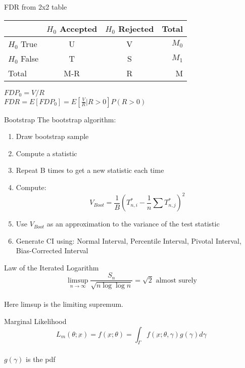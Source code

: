 \documentclass[avery5388,grid,frame]{flashcards}
\begin{document}
\begin{flashcard}[Definition]{FDR from 2x2 table}
\bigskip\bigskip
\begin{center}
{\begin{tabular}{l|c|c|r}
\hline
&\textrm{$H_0$ Accepted}&\textrm{$H_0$ Rejected}&Total\\
\hline
\textrm{$H_0$ True}& U & V& $M_0$\\
\hline
\textrm{$H_0$ False}&T&S&$M_1$\\
\hline
\textrm{Total}&M-R&R&M\\
\hline
\end{tabular}}
\end{center}
$FDP_0=V/R$\\
$FDR=E[FDP_0]=E\left[\frac{V}{R}|R>0\right]P(R>0)$
\end{flashcard}
\begin{flashcard}[Definition]{Bootstrap}
The bootstrap algorithm:
\begin{enumerate}
\item Draw bootstrap sample
\item Compute a statistic
\item Repeat B times to get a new statistic each time
\item Compute:
\begin{equation*}
V_{Boot}=\frac{1}{B}\left(T^*_{n,i}-\frac{1}{n}\sum T^*_{n,j}\right)^2
\end{equation*}
\item Use $V_{Boot}$ as an approximation to the variance of the test statistic
\item Generate CI using: Normal Interval, Percentile Interval, Pivotal Interval, Bias-Corrected Interval
\end{enumerate}
\end{flashcard}
\begin{flashcard}[Definition]{Law of the Iterated Logarithm}
\bigskip\bigskip\bigskip
\begin{equation*}
\limsup_{n\rightarrow\infty}\frac{S_n}{\sqrt{n\log\log n}}=\sqrt{2} \textrm{ almost surely}
\end{equation*}
\bigskip\\Here limsup is the limiting supremum.
\end{flashcard}
\begin{flashcard}[Definition]{Marginal Likelihood}
\bigskip\bigskip\bigskip
\begin{equation*}
L_m(\theta;\underbar{x})=f(\underbar{x};\theta)=\int_\Gamma f(\underbar{x};\theta,\gamma)g(\gamma)d\gamma
\end{equation*}
\bigskip\\
$g(\gamma)$ is the pdf
\end{flashcard}
\end{document}
